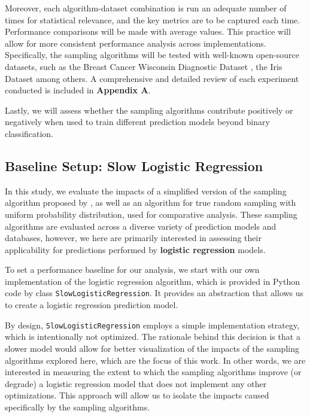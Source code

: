 \documentclass{article}
\theoremstyle{plain}
\theoremstyle{definition}
\theoremstyle{remark}
\begin{document}
Moreover, each algorithm-dataset combination is run an adequate number of times for statistical relevance, and the key metrics are to be captured each time. Performance comparisons will be made with average values. This practice will allow for more consistent performance analysis across implementations. Specifically, the sampling algorithms will be tested with well-known open-source datasets, such as the Breast Cancer Wisconsin Diagnostic Dataset \cite{breastcancer}, the Iris Dataset \cite{iris} among others. A comprehensive and detailed review of each experiment conducted is included in \textbf{Appendix A}.

Lastly, we will assess whether the sampling algorithms contribute positively or negatively when used to train different prediction models beyond binary classification.


\subsection{Baseline Setup: Slow Logistic Regression}

In this study, we evaluate the impacts of a simplified version of the sampling algorithm proposed by \citet{chow24}, as well as an algorithm for true random sampling with uniform probability distribution, used for comparative analysis. These sampling algorithms are evaluated across a diverse variety of prediction models and databases, however, we here are primarily interested in assessing their applicability for predictions performed by \textbf{logistic regression} models. 

To set a performance baseline for our analysis, we start with our own implementation of the logistic regression algorithm, which is provided in Python code by class \texttt{SlowLogisticRegression}. It provides an abstraction that allows us to create a logistic regression prediction model.

By design, \texttt{SlowLogisticRegression} employs a simple implementation strategy, which is intentionally not optimized. The rationale behind this decision is that a slower model would allow for better visualization of the impacts of the sampling algorithms explored here, which are the focus of this work. In other words, we are interested in measuring the extent to which the sampling algorithms improve (or degrade) a logistic regression model that does not implement any other optimizations. This approach will allow us to isolate the impacts caused specifically by the sampling algorithms.
\end{document}
